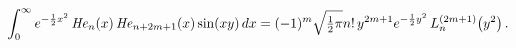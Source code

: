 \[\int_{0}^{\infty}e^{-\frac{1}{2}x^{2}}\mathop{\mathit{He}_{n}\/}\nolimits\!%
\left(x\right)\mathop{\mathit{He}_{n+2m+1}\/}\nolimits\!\left(x\right)\mathop{%
\sin\/}\nolimits\!\left(xy\right)dx=(-1)^{m}\sqrt{\tfrac{1}{2}\pi}n!\,y^{2m+1}%
e^{-\frac{1}{2}y^{2}}\mathop{L^{(2m+1)}_{n}\/}\nolimits\!\left(y^{2}\right).\]